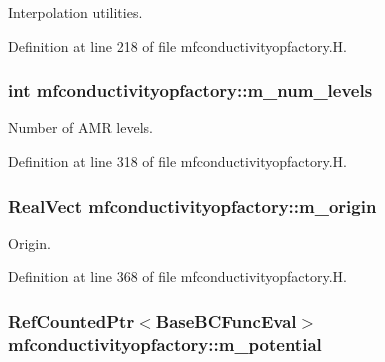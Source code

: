 Interpolation utilities. 



Definition at line 218 of file mfconductivityopfactory.\+H.

\subsubsection[{\texorpdfstring{m\+\_\+num\+\_\+levels}{m_num_levels}}]{\setlength{\rightskip}{0pt plus 5cm}int mfconductivityopfactory\+::m\+\_\+num\+\_\+levels\hspace{0.3cm}{\ttfamily [protected]}}\hypertarget{classmfconductivityopfactory_a79fcbdb831f04881f1f10b244dc8d81d}{}\label{classmfconductivityopfactory_a79fcbdb831f04881f1f10b244dc8d81d}


Number of A\+MR levels. 



Definition at line 318 of file mfconductivityopfactory.\+H.

\subsubsection[{\texorpdfstring{m\+\_\+origin}{m_origin}}]{\setlength{\rightskip}{0pt plus 5cm}Real\+Vect mfconductivityopfactory\+::m\+\_\+origin\hspace{0.3cm}{\ttfamily [protected]}}\hypertarget{classmfconductivityopfactory_a72dd438f1ac2b40b515406bccea4446c}{}\label{classmfconductivityopfactory_a72dd438f1ac2b40b515406bccea4446c}


Origin. 



Definition at line 368 of file mfconductivityopfactory.\+H.

\subsubsection[{\texorpdfstring{m\+\_\+potential}{m_potential}}]{\setlength{\rightskip}{0pt plus 5cm}Ref\+Counted\+Ptr$<$Base\+B\+C\+Func\+Eval$>$ mfconductivityopfactory\+::m\+\_\+potential\hspace{0.3cm}{\ttfamily [protected]}}\hypertarget{classmfconductivityopfactory_ad5f2b079d2b6b3bf4bcf3cb21609484d}{}\label{classmfconductivityopfactory_ad5f2b079d2b6b3bf4bcf3cb21609484d}


